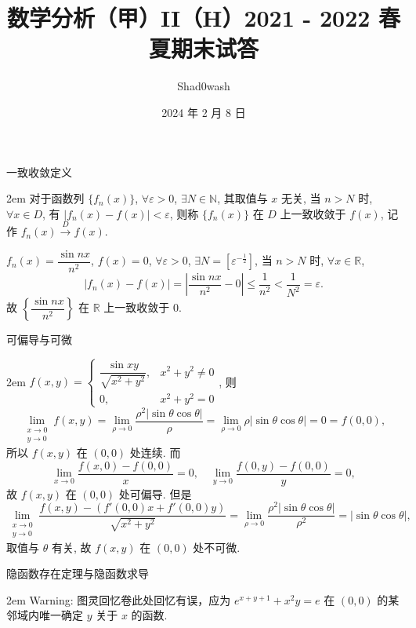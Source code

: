 \documentclass[UTF8,14pt,normal]{ctexart}
\title{数学分析（甲）II（H）2021 - 2022 春夏期末试答}
\author{Shad0wash}
\date{2024 年 2 月 8 日}
\begin{document}
\maketitle

 一致收敛定义

    \hangindent 2em
    \noindent
    对于函数列 \(\{f_n(x)\}\), \(\forall \varepsilon > 0\), \(\exists N \in \mathbb{N}\), 其取值与 \(x\) 无关, 当 \(n > N\) 时, \(\forall x \in D\), 有 \(\lvert f_n(x) - f(x) \rvert < \varepsilon\), 则称 \(\{f_n(x)\}\) 在 \(D\) 上一致收敛于 \(f(x)\), 记作 \(f_n(x) \xrightarrow{D} f(x)\).

    \(f_n(x) = \dfrac{\sin nx}{n^2}\), \(f(x) = 0\), \(\forall \varepsilon > 0\), \(\exists N = \left[ \varepsilon^{-\frac{1}{2}} \right]\), 当 \(n > N\) 时, \(\forall x \in \mathbb{R}\),
    \[
        \lvert f_n(x) - f(x) \rvert = \left\lvert \dfrac{\sin nx}{n^2} - 0 \right\rvert \leqslant \dfrac{1}{n^2} < \dfrac{1}{N^2} = \varepsilon.
    \]
    故 \(\left\{ \dfrac{\sin nx}{n^2} \right\}\) 在 \(\mathbb{R}\) 上一致收敛于 \(0\).

 可偏导与可微

    \hangindent 2em
    \noindent
    \(f(x, y) = \begin{cases} \dfrac{\sin xy}{\sqrt{x^2 + y^2}}, & x^2 + y^2 \neq 0 \\ 0, & x^2 + y^2 = 0 \end{cases}\), 则
    \[
        \lim_{\substack{x \to 0 \\ y \to 0}} f(x, y) = \lim_{\rho \to 0} \dfrac{\rho^2 \lvert \sin \theta \cos \theta \rvert}{\rho} = \lim_{\rho \to 0} \rho \lvert \sin \theta \cos \theta \rvert = 0 = f(0, 0),
    \]
    所以 \(f(x, y)\) 在 \((0, 0)\) 处连续. 而
    \[
        \lim_{x \to 0} \dfrac{f(x, 0) - f(0, 0)}{x} = 0, \quad \lim_{y \to 0} \dfrac{f(0, y) - f(0, 0)}{y} = 0,
    \]
    故 \(f(x, y)\) 在 \((0, 0)\) 处可偏导. 但是
    \[
        \lim_{\substack{x \to 0 \\ y \to 0}} \dfrac{f(x, y) - (f'(0, 0) x + f'(0, 0) y)}{\sqrt{x^2 + y^2}} = \lim_{\rho \to 0} \dfrac{\rho^2 \lvert \sin \theta \cos \theta \rvert }{\rho^2} = \lvert \sin \theta \cos \theta \rvert,
    \]
    取值与 \(\theta\) 有关, 故 \(f(x, y)\) 在 \((0, 0)\) 处不可微.


 隐函数存在定理与隐函数求导


    \hangindent 2em
    \noindent
    Warning: 图灵回忆卷此处回忆有误，应为 \(e^{x + y + 1} + x^2y = e\) 在 \((0, 0)\) 的某邻域内唯一确定 \(y\) 关于 \(x\) 的函数.
\end{document}
